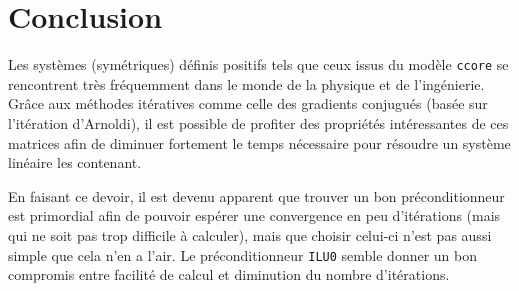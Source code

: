 \documentclass[11pt]{article}
\begin{document}
\section*{Conclusion}
Les systèmes (symétriques) définis positifs tels que ceux issus du modèle \texttt{ccore} se rencontrent très fréquemment dans le monde de la physique et de l'ingénierie. Grâce aux méthodes itératives comme celle des gradients conjugués (basée sur l'itération d'Arnoldi), il est possible de profiter des propriétés intéressantes de ces matrices afin de diminuer fortement le temps nécessaire pour résoudre un système linéaire les contenant.

En faisant ce devoir, il est devenu apparent que trouver un bon préconditionneur est primordial afin de pouvoir espérer une convergence en peu d'itérations (mais qui ne soit pas trop difficile à calculer), mais que choisir celui-ci n'est pas aussi simple que cela n'en a l'air. Le préconditionneur \texttt{ILU0} semble donner un bon compromis entre facilité de calcul et diminution du nombre d'itérations.
\end{document}
